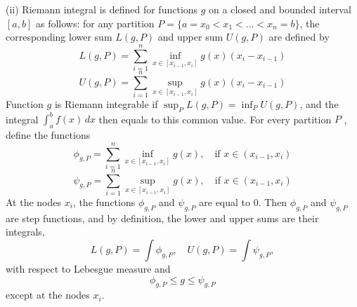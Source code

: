 \documentclass[12pt,a4paper]{ctexart}
\begin{document}
\vspace{8pt}

(ii) Riemann integral is defined for functions $g$ on a closed and bounded interval $[a, b]$ as follows: for any partition $P = \{ a = x_{0} < x_{1} < \dots < x_{n} = b\}$, the corresponding lower sum $L(g, P)$ and upper sum $U(g, P)$ are defined by
\begin{equation*}
    L(g, P) = \sum_{i = 1}^{n} \inf_{x \in [x_{i-1}, x_{i}]} g(x) (x_{i} - x_{i-1})
\end{equation*}
\begin{equation*}
    U(g, P) = \sum_{i = 1}^{n} \sup_{x \in [x_{i-1}, x_{i}]} g(x) (x_{i} - x_{i-1})
\end{equation*}
Function $g$ is Riemann integrable if $\sup_{P} L(g, P) = \inf_{P} U(g, P)$, and the integral $\int_{a}^{b} f(x) \, d x$ then equals to this common value. For every partition $P$ , define the functions
\begin{equation*}
    \phi_{g, P} = \sum_{i = 1}^{n} \inf_{x \in [x_{i-1}, x_{i}]} g(x), \quad \text{if} \, \,   x \in (x_{i-1}, x_{i})
\end{equation*}
\begin{equation*}
    \psi_{g, P} = \sum_{i = 1}^{n} \sup_{x \in [x_{i-1}, x_{i}]} g(x), \quad \text{if} \, \,  x \in (x_{i-1}, x_{i})
\end{equation*}
At the nodes $x_{i}$, the functions $\phi_{g, P}$ and $\psi_{g, P}$ are equal to $0$. Then $\phi_{g, P}$ and $\psi_{g, P}$ are step functions, and by definition, the lower and upper sums are their integrals,
\begin{equation*}
     L(g, P) = \int \phi_{g, P} , \quad  U(g, P) = \int \psi_{g, P} , 
\end{equation*}
with respect to Lebesgue measure and 
\begin{equation*}
    \phi_{g, P} \leq g \leq \psi_{g, P}
\end{equation*}
except at the nodes $x_{i}$.
\end{document}
